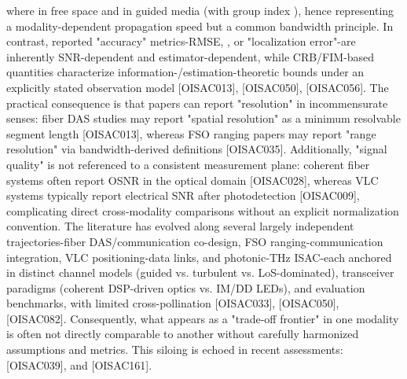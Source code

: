 {}where  in free space and  in guided media (with group index ), hence representing a modality-dependent propagation speed but a common bandwidth principle. In contrast, reported "accuracy" metrics-RMSE, , or "localization error"-are inherently SNR-dependent and estimator-dependent, while CRB/FIM-based quantities characterize information-/estimation-theoretic bounds under an explicitly stated observation model [O\markdownRendererUnderscore{}ISAC\markdownRendererUnderscore{}013], [O\markdownRendererUnderscore{}ISAC\markdownRendererUnderscore{}050], [O\markdownRendererUnderscore{}ISAC\markdownRendererUnderscore{}056]. The practical consequence is that papers can report "resolution" in incommensurate senses: fiber DAS studies may report "spatial resolution" as a minimum resolvable segment length [O\markdownRendererUnderscore{}ISAC\markdownRendererUnderscore{}013], whereas FSO ranging papers may report "range resolution" via bandwidth-derived definitions [O\markdownRendererUnderscore{}ISAC\markdownRendererUnderscore{}035]. Additionally, "signal quality" is not referenced to a consistent measurement plane: coherent fiber systems often report OSNR in the optical domain [O\markdownRendererUnderscore{}ISAC\markdownRendererUnderscore{}028], whereas VLC systems typically report electrical SNR after photodetection [O\markdownRendererUnderscore{}ISAC\markdownRendererUnderscore{}009], complicating direct cross-modality comparisons without an explicit normalization convention.\markdownRendererParagraphSeparator
{} The literature has evolved along several largely independent trajectories-fiber DAS/communication co-design, FSO ranging-communication integration, VLC positioning-data links, and photonic-THz ISAC-each anchored in distinct channel models (guided vs. turbulent vs. LoS-dominated), transceiver paradigms (coherent DSP-driven optics vs. IM/DD LEDs), and evaluation benchmarks, with limited cross-pollination [O\markdownRendererUnderscore{}ISAC\markdownRendererUnderscore{}033], [O\markdownRendererUnderscore{}ISAC\markdownRendererUnderscore{}050], [O\markdownRendererUnderscore{}ISAC\markdownRendererUnderscore{}082]. Consequently, what appears as a "trade-off frontier" in one modality is often not directly comparable to another without carefully harmonized assumptions and metrics. This siloing is echoed in recent assessments:  [O\markdownRendererUnderscore{}ISAC\markdownRendererUnderscore{}039], and  [O\markdownRendererUnderscore{}ISAC\markdownRendererUnderscore{}161].\markdownRendererParagraphSeparator
